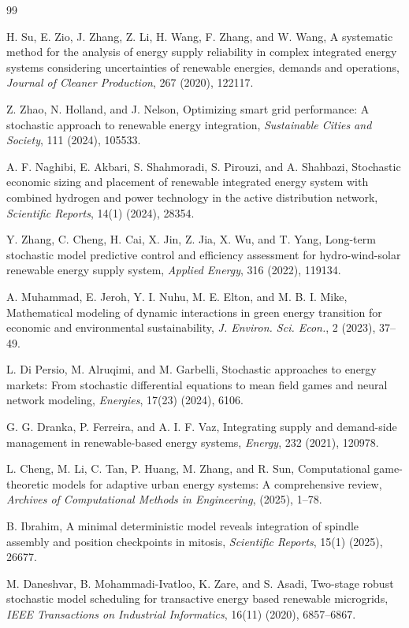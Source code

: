 \documentclass[11pt]{article}
\numberwithin{equation}{section}
\begin{document}
\begin{thebibliography}{99}

H. Su, E. Zio, J. Zhang, Z. Li, H. Wang, F. Zhang, and W. Wang,
A systematic method for the analysis of energy supply reliability in complex integrated energy systems considering uncertainties of renewable energies, demands and operations,
\emph{Journal of Cleaner Production}, 267 (2020), 122117.

Z. Zhao, N. Holland, and J. Nelson,
Optimizing smart grid performance: A stochastic approach to renewable energy integration,
\emph{Sustainable Cities and Society}, 111 (2024), 105533.

A. F. Naghibi, E. Akbari, S. Shahmoradi, S. Pirouzi, and A. Shahbazi,
Stochastic economic sizing and placement of renewable integrated energy system with combined hydrogen and power technology in the active distribution network,
\emph{Scientific Reports}, 14(1) (2024), 28354.

Y. Zhang, C. Cheng, H. Cai, X. Jin, Z. Jia, X. Wu, and T. Yang,
Long-term stochastic model predictive control and efficiency assessment for hydro-wind-solar renewable energy supply system,
\emph{Applied Energy}, 316 (2022), 119134.

A. Muhammad, E. Jeroh, Y. I. Nuhu, M. E. Elton, and M. B. I. Mike,
Mathematical modeling of dynamic interactions in green energy transition for economic and environmental sustainability,
\emph{J. Environ. Sci. Econ.}, 2 (2023), 37--49.

L. Di Persio, M. Alruqimi, and M. Garbelli,
Stochastic approaches to energy markets: From stochastic differential equations to mean field games and neural network modeling,
\emph{Energies}, 17(23) (2024), 6106.

G. G. Dranka, P. Ferreira, and A. I. F. Vaz,
Integrating supply and demand-side management in renewable-based energy systems,
\emph{Energy}, 232 (2021), 120978.

L. Cheng, M. Li, C. Tan, P. Huang, M. Zhang, and R. Sun,
Computational game-theoretic models for adaptive urban energy systems: A comprehensive review,
\emph{Archives of Computational Methods in Engineering}, (2025), 1--78.

B. Ibrahim,
A minimal deterministic model reveals integration of spindle assembly and position checkpoints in mitosis,
\emph{Scientific Reports}, 15(1) (2025), 26677.

M. Daneshvar, B. Mohammadi-Ivatloo, K. Zare, and S. Asadi,
Two-stage robust stochastic model scheduling for transactive energy based renewable microgrids,
\emph{IEEE Transactions on Industrial Informatics}, 16(11) (2020), 6857--6867.


\end{thebibliography}
\end{document}
